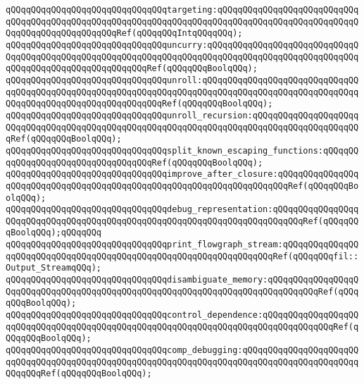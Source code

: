 \newline
\verb|qQQqqQQqqQQqqQQqqQQqqQQqqQQqqQQqtargeting:qQQqqQQqqQQqqQQqqQQqqQQqqQQqqQQqqQQqqQQqqQQqqQQqqQQqqQQqqQQqqQQqqQQqqQQqqQQqqQQqqQQqqQQqqQQqqQQqqQQqqQQqqQQqqQQqqQQqqQQqRef(qQQqqQQqIntqQQqqQQq);|\newline
\newline
\verb|qQQqqQQqqQQqqQQqqQQqqQQqqQQqqQQquncurry:qQQqqQQqqQQqqQQqqQQqqQQqqQQqqQQqqQQqqQQqqQQqqQQqqQQqqQQqqQQqqQQqqQQqqQQqqQQqqQQqqQQqqQQqqQQqqQQqqQQqqQQqqQQqqQQqqQQqqQQqqQQqqQQqRef(qQQqqQQqBoolqQQq);|\newline
\verb|qQQqqQQqqQQqqQQqqQQqqQQqqQQqqQQqunroll:qQQqqQQqqQQqqQQqqQQqqQQqqQQqqQQqqQQqqQQqqQQqqQQqqQQqqQQqqQQqqQQqqQQqqQQqqQQqqQQqqQQqqQQqqQQqqQQqqQQqqQQqqQQqqQQqqQQqqQQqqQQqqQQqqQQqRef(qQQqqQQqBoolqQQq);|\newline
\verb|qQQqqQQqqQQqqQQqqQQqqQQqqQQqqQQqunroll_recursion:qQQqqQQqqQQqqQQqqQQqqQQqqQQqqQQqqQQqqQQqqQQqqQQqqQQqqQQqqQQqqQQqqQQqqQQqqQQqqQQqqQQqqQQqqQQqRef(qQQqqQQqBoolqQQq);|\newline
\newline
\verb|qQQqqQQqqQQqqQQqqQQqqQQqqQQqqQQqsplit_known_escaping_functions:qQQqqQQqqQQqqQQqqQQqqQQqqQQqqQQqqQQqRef(qQQqqQQqBoolqQQq);|\newline
\verb|qQQqqQQqqQQqqQQqqQQqqQQqqQQqqQQqimprove_after_closure:qQQqqQQqqQQqqQQqqQQqqQQqqQQqqQQqqQQqqQQqqQQqqQQqqQQqqQQqqQQqqQQqqQQqqQQqRef(qQQqqQQqBoolqQQq);|\newline
\verb|qQQqqQQqqQQqqQQqqQQqqQQqqQQqqQQqdebug_representation:qQQqqQQqqQQqqQQqqQQqqQQqqQQqqQQqqQQqqQQqqQQqqQQqqQQqqQQqqQQqqQQqqQQqqQQqqQQqRef(qQQqqQQqBoolqQQq);qQQqqQQq|\newline
\newline
\verb|qQQqqQQqqQQqqQQqqQQqqQQqqQQqqQQqprint_flowgraph_stream:qQQqqQQqqQQqqQQqqQQqqQQqqQQqqQQqqQQqqQQqqQQqqQQqqQQqqQQqqQQqqQQqqQQqRef(qQQqqQQqfil::Output_StreamqQQq);|\newline
\newline
\verb|qQQqqQQqqQQqqQQqqQQqqQQqqQQqqQQqdisambiguate_memory:qQQqqQQqqQQqqQQqqQQqqQQqqQQqqQQqqQQqqQQqqQQqqQQqqQQqqQQqqQQqqQQqqQQqqQQqqQQqqQQqRef(qQQqqQQqBoolqQQq);|\newline
\verb|qQQqqQQqqQQqqQQqqQQqqQQqqQQqqQQqcontrol_dependence:qQQqqQQqqQQqqQQqqQQqqQQqqQQqqQQqqQQqqQQqqQQqqQQqqQQqqQQqqQQqqQQqqQQqqQQqqQQqqQQqqQQqRef(qQQqqQQqBoolqQQq);|\newline
\verb|qQQqqQQqqQQqqQQqqQQqqQQqqQQqqQQqcomp_debugging:qQQqqQQqqQQqqQQqqQQqqQQqqQQqqQQqqQQqqQQqqQQqqQQqqQQqqQQqqQQqqQQqqQQqqQQqqQQqqQQqqQQqqQQqqQQqqQQqqQQqRef(qQQqqQQqBoolqQQq);|\newline
